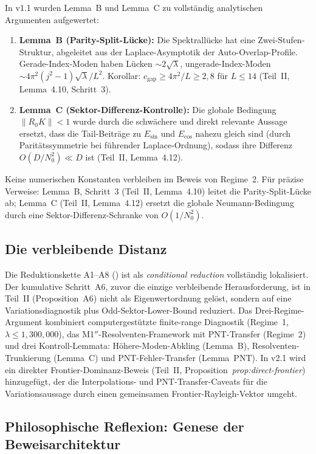 \documentclass[12pt,a4paper]{article}
\theoremstyle{definition}
\theoremstyle{remark}
\begin{document}
In v1.1 wurden Lemma~B und Lemma~C zu vollständig analytischen Argumenten aufgewertet:
\begin{enumerate}
  \item \textbf{Lemma~B (Parity-Split-Lücke):} Die Spektrallücke hat eine Zwei-Stufen-Struktur, abgeleitet aus der Laplace-Asymptotik der Auto-Overlap-Profile. Gerade-Index-Moden haben Lücken $\sim 2\sqrt{\lambda}$, ungerade-Index-Moden $\sim 4\pi^2(j^2-1)\sqrt{\lambda}/L^2$. Korollar: $c_{\mathrm{gap}} \geq 4\pi^2/L \geq 2{,}8$ für $L \leq 14$ (Teil~II, Lemma~4.10, Schritt~3).
  \item \textbf{Lemma~C (Sektor-Differenz-Kontrolle):} Die globale Bedingung $\|R_0 K\| < 1$ wurde durch die schwächere und direkt relevante Aussage ersetzt, dass die Tail-Beiträge zu $E_{\sin}$ und $E_{\cos}$ nahezu gleich sind (durch Paritätssymmetrie bei führender Laplace-Ordnung), sodass ihre Differenz $O(D/N_0^2) \ll D$ ist (Teil~II, Lemma~4.12).
\end{enumerate}
Keine numerischen Konstanten verbleiben im Beweis von Regime~2. Für präzise Verweise: Lemma~B, Schritt~3 (Teil~II, Lemma~4.10) leitet die Parity-Split-Lücke ab; Lemma~C (Teil~II, Lemma~4.12) ersetzt die globale Neumann-Bedingung durch eine Sektor-Differenz-Schranke von $O(1/N_0^2)$.

\subsection{Die verbleibende Distanz}

Die Reduktionskette A1--A8 () ist als \emph{conditional reduction} vollständig lokalisiert. Der kumulative Schritt~A6, zuvor die einzige verbleibende Herausforderung, ist in Teil~II (Proposition~A6) nicht als Eigenwertordnung gelöst, sondern auf eine Variationsdiagnostik plus Odd-Sektor-Lower-Bound reduziert. Das Drei-Regime-Argument kombiniert computergestützte finite-range Diagnostik (Regime~1, $\lambda \leq 1{,}300{,}000$), das M1$''$-Resolventen-Framework mit PNT-Transfer (Regime~2) und drei Kontroll-Lemmata: Höhere-Moden-Abkling (Lemma~B), Resolventen-Trunkierung (Lemma~C) und PNT-Fehler-Transfer (Lemma~PNT). In v2.1 wird ein direkter Frontier-Dominanz-Beweis (Teil~II, Proposition~\emph{prop:direct-frontier}) hinzugefügt, der die Interpolations- und PNT-Transfer-Caveats für die Variationsaussage durch einen gemeinsamen Frontier-Rayleigh-Vektor umgeht.

\subsection{Philosophische Reflexion: Genese der Beweisarchitektur}
\end{document}
